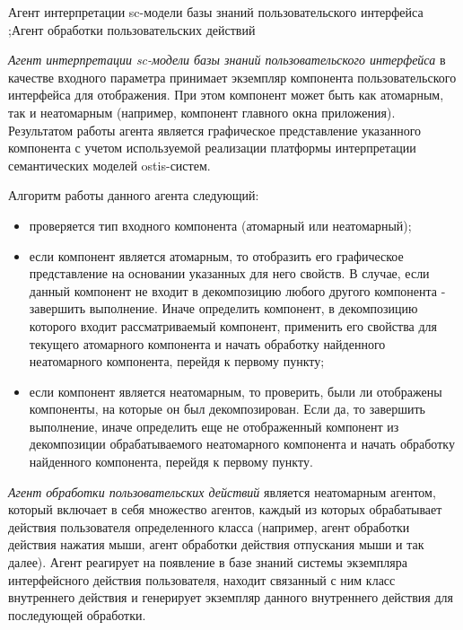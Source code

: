 \begin{SCn}
	
\scnsectionheader{\currentname}
	
\scnstartsubstruct


 {
	Агент интерпретации sc-модели базы знаний пользовательского интерфейса
	;Агент обработки пользовательских действий
}

\textit{Агент интерпретации sc-модели базы знаний пользовательского интерфейса} в качестве входного параметра принимает экземпляр компонента пользовательского интерфейса для отображения. При этом компонент может быть как атомарным, так и неатомарным (например, компонент главного окна приложения). Результатом работы агента является графическое представление указанного компонента с учетом используемой реализации платформы интерпретации семантических моделей ostis-систем.

Алгоритм работы данного агента следующий:
\begin{itemize}
	\item проверяется тип входного компонента (атомарный или неатомарный);
	\item если компонент является атомарным, то отобразить его графическое представление на основании указанных для него свойств. В случае, если данный компонент не входит в декомпозицию любого другого компонента - завершить выполнение. Иначе определить компонент, в декомпозицию которого входит рассматриваемый компонент, применить его свойства для текущего атомарного компонента и начать обработку найденного неатомарного компонента, перейдя к первому пункту;
	\item если компонент является неатомарным, то проверить, были ли отображены компоненты, на которые он был декомпозирован. Если да, то завершить выполнение, иначе определить еще не отображенный компонент из декомпозиции обрабатываемого неатомарного компонента и начать обработку найденного компонента, перейдя к первому пункту.
\end{itemize}

\textit{Агент обработки пользовательских действий} является неатомарным агентом, который включает в себя множество агентов, каждый из которых обрабатывает действия пользователя определенного класса (например, агент обработки действия нажатия мыши, агент обработки действия отпускания мыши и так далее). Агент реагирует на появление в базе знаний системы экземпляра интерфейсного действия пользователя, находит связанный с ним класс внутреннего действия и генерирует экземпляр данного внутреннего действия для последующей обработки.




\end{SCn}
